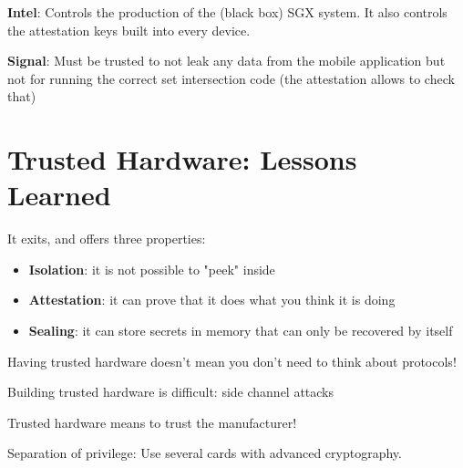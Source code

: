 \documentclass[11pt]{article}
\begin{document}
\textbf{Intel}: Controls the production of the (black box) SGX system. It also controls the attestation keys built into every device.

\textbf{Signal}: Must be trusted to not leak any data from the mobile application but not for running the correct set intersection code (the attestation allows to check that)


\section*{Trusted Hardware: Lessons Learned}

It exits, and offers three properties:
\begin{itemize}
	\item \textbf{Isolation}: it is not possible to "peek" inside
	\item \textbf{Attestation}: it can prove that it does what you think it is doing
	\item \textbf{Sealing}: it can store secrets in memory that can only be recovered by itself
\end{itemize}

\begin{tcolorbox}[
  colback=orange!15,     %
  colframe=black!50,    %
  boxrule=1pt,       %
  arc=3mm,             %
  left=4mm, right=4mm, top=2mm, bottom=2mm %
]
Having trusted hardware doesn't mean you don't need to think about protocols!
\end{tcolorbox}

Building trusted hardware is difficult: side channel attacks

Trusted hardware means to trust the manufacturer!

Separation of privilege: Use several cards with advanced cryptography.
\end{document}
